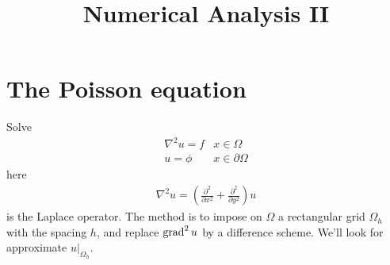 \documentclass[a4paper]{article}
\begin{document}
\title{Numerical Analysis II}

\maketitle

\newpage

\tableofcontents

\newpage

\section{The Poisson equation}

\begin{prob} 
Solve
\begin{equation*}
\begin{aligned}
\nabla^2 u = f & x \in \Omega\\
u = \phi & x \in \partial\Omega
\end{aligned}
\end{equation*}
here
\begin{equation*}
\begin{aligned}
\nabla^2 u = \left(\frac{\partial^2}{\partial x^2} + \frac{\partial^2}{\partial y^2} \right)u
\end{aligned}
\end{equation*}
is the Laplace operator. The method is to impose on $\Omega$ a rectangular grid $\Omega_h$ with the spacing $h$, and replace $\operatorname{grad}^2 u$ by a difference scheme. We'll look for approximate $u|_{\Omega_h}$.
\end{prob}
\end{document}
